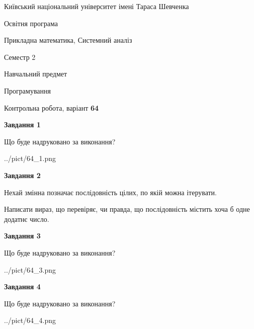 \documentclass[12pt, ukrainian]{article}
\begin{document}
{{\begin {small}\par
{ \center  Київський національний університет імені Тараса Шевченка \par}
{\parbox {5 cm}{Освітня програма \hfill}{\parbox {8 cm}{Прикладна математика, Системний аналіз \hfill}}\parbox {5 cm}{\hfill Семестр 2}}\par
{\parbox {5 cm} {Навчальний предмет \hfill}\parbox {7 cm}{Програмування \hfill}\parbox {6cm}{\hfill}\par}\vspace{-7pt} \end{small}}{\center Контрольна робота, варіант  \No \textbf
{ 64 }\par}}
{
\begin {large}
{\begin {center}\textbf{Завдання 1}\end {center}}\par
Що буде надруковано за виконання?\par\par
\begin{center}
	{../pict/64_1.png}
\end{center}
\newpage

{\begin {center}\textbf{Завдання 2}\end {center}}\par
Нехай змінна  позначає послідовність цілих, по якій можна ітерувати.

Написати вираз, що перевіряє, чи правда, що послідовність  містить хоча б одне додатнє число.\par
\newpage

{\begin {center}\textbf{Завдання 3}\end {center}}\par
Що буде надруковано за виконання?
\begin{center}
	{../pict/64_3.png}
\end{center}
\newpage

{\begin {center}\textbf{Завдання 4}\end {center}}\par
Що буде надруковано за виконання?\par
\begin{center}
	{../pict/64_4.png}
\end{center}
\newpage


\end{large}}
\end{document}
